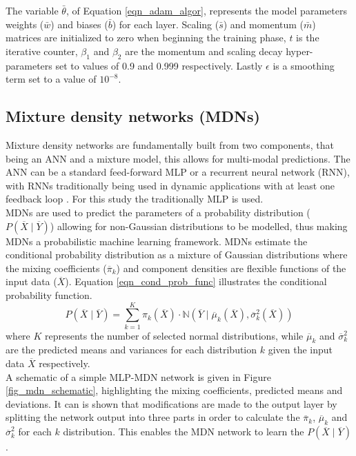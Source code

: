 \documentclass[a4paper,fleqn]{cas-sc}
\begin{document}
The variable $\bar{\theta}$, of Equation \ref{eqn_adam_algor}, represents the model parameters weights ($\bar{w}$) and biases ($\bar{b}$) for each layer. Scaling ($\bar{s}$) and momentum ($\bar{m}$) matrices are initialized to zero when beginning the training phase, $t$ is the iterative counter, $\beta_1$ and $\beta_2$ are the momentum and scaling decay hyper-parameters set to values of 0.9 and 0.999 respectively. Lastly $\epsilon$ is a smoothing term set to a value of $10^{-8}$.

\subsection{Mixture density networks (MDNs)}
Mixture density networks are fundamentally built from two components, that being an ANN and a mixture model, this allows for multi-modal predictions. The ANN can be a standard feed-forward MLP or a recurrent neural network (RNN), with RNNs traditionally being used in dynamic applications with at least one feedback loop \citep{Oko2015}. For this study the traditionally MLP is used.\\

MDNs are used to predict the parameters of a probability distribution ($P(\overline{X}\mid\overline{Y})$) allowing for non-Gaussian distributions to be modelled, thus making MDNs a probabilistic machine learning framework. MDNs estimate the conditional probability distribution as a mixture of Gaussian distributions where the mixing coefficients ($\overline{\pi}_k$) and component densities are flexible functions of the input data ($\overline{X}$). Equation \ref{eqn_cond_prob_func} illustrates the conditional probability function.
\begin{equation}\label{eqn_cond_prob_func}
P(\overline{X}\mid\overline{Y}) = \sum_{k=1}^K\pi_k(\overline{X})\cdot \mathbb{N}(\overline{Y}\mid \overline{\mu}_k(\overline{X}),\overline{\sigma}^2_k(\overline{X}))
\end{equation}
where $K$ represents the number of selected normal distributions, while $\overline{\mu}_k$ and $\overline{\sigma}^2_k$ are the predicted means and variances for each distribution $k$ given the input data $\overline{X}$ respectively.\\

A schematic of a simple MLP-MDN network is given in Figure \ref{fig_mdn_schematic}, highlighting the mixing coefficients, predicted means and deviations. It can is shown that modifications are made to the output layer by splitting the network output into three parts in order to calculate the $\overline{\pi}_k$, $\overline{\mu}_k$ and $\overline{\sigma}^2_k$ for each $k$ distribution. This enables the MDN network to learn the $P(\overline{X}\mid\overline{Y})$.\\
\end{document}
